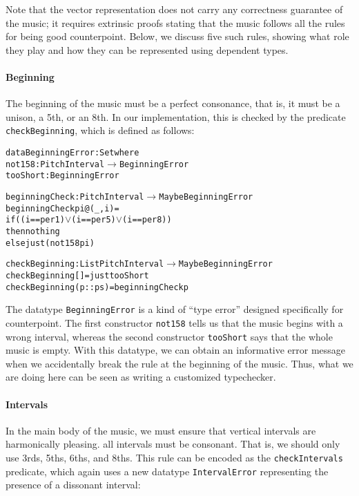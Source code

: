 Note that the vector representation does not carry any correctness
guarantee of the music;
it requires extrinsic proofs stating that the music follows all the
rules for being good counterpoint.
Below, we discuss five such rules, showing what role they play
and how they can be represented using dependent types.

\paragraph{Beginning}
The beginning of the music must be a perfect consonance,
that is, it must be a unison, a 5th, or an 8th.
In our implementation, this is checked by the predicate
\texttt{checkBeginning}, which is defined as follows:

\begin{alltt}
data BeginningError : Set where
  not158   : PitchInterval \(\rightarrow\) BeginningError
  tooShort : BeginningError
  
beginningCheck : PitchInterval \(\rightarrow\) Maybe BeginningError
beginningCheck pi@(_ , i) =
  if ((i == per1) \(\vee\) (i == per5) \(\vee\) (i == per8))
  then nothing
  else just (not158 pi)

checkBeginning : List PitchInterval \(\rightarrow\) Maybe BeginningError
checkBeginning []       = just tooShort
checkBeginning (p :: ps) = beginningCheck p  
\end{alltt}

\noindent The datatype \texttt{BeginningError} is a kind of
``type error'' designed specifically for counterpoint.
The first constructor \texttt{not158} tells us that the music
begins with a wrong interval, whereas the second constructor
\texttt{tooShort} says that the whole music is empty.
With this datatype, we can obtain an informative error message
when we accidentally break the rule at the beginning of the music.
Thus, what we are doing here can be seen as writing a
customized typechecker.

\paragraph{Intervals}
In the main body of the music, we must ensure that vertical intervals
are harmonically pleasing.
all intervals must be consonant.
That is, we should only use 3rds, 5ths, 6ths, and 8ths.
This rule can be encoded as the \texttt{checkIntervals} predicate,
which again uses a new datatype \texttt{IntervalError} representing
the presence of a dissonant interval:

